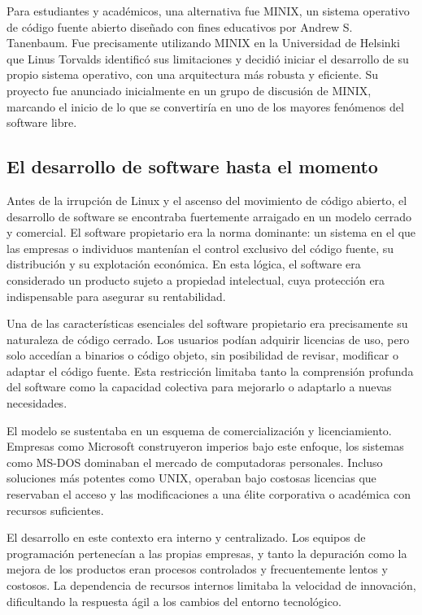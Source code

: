 \documentclass[a4paper,12pt]{article}
\begin{document}
Para estudiantes y académicos, una alternativa fue MINIX, un
sistema operativo de código fuente abierto diseñado con fines educativos por
Andrew S. Tanenbaum.  Fue precisamente utilizando MINIX en la
Universidad de Helsinki que Linus Torvalds identificó sus limitaciones y decidió
iniciar el desarrollo de su propio sistema operativo, con una arquitectura más
robusta y eficiente. Su proyecto fue anunciado inicialmente en un grupo de
discusión de MINIX, marcando el inicio de lo que se
convertiría en uno de los mayores fenómenos del software libre.


\subsection{El desarrollo de software hasta el momento}

Antes de la irrupción de Linux y el ascenso del movimiento de código abierto, el
desarrollo de software se encontraba fuertemente arraigado en un modelo cerrado
y comercial. El software propietario era la norma dominante: un sistema en el
que las empresas o individuos mantenían el control exclusivo del código fuente,
su distribución y su explotación económica. En esta lógica, el software era
considerado un producto sujeto a propiedad intelectual, cuya protección era
indispensable para asegurar su rentabilidad.

Una de las características esenciales del software propietario era precisamente
su naturaleza de código cerrado. Los usuarios podían adquirir licencias de uso,
pero solo accedían a binarios o código objeto, sin posibilidad de revisar,
modificar o adaptar el código fuente. Esta restricción limitaba tanto la
comprensión profunda del software como la capacidad colectiva para mejorarlo o
adaptarlo a nuevas necesidades.

El modelo se sustentaba en un esquema de comercialización y licenciamiento.
Empresas como Microsoft construyeron imperios bajo este
enfoque, los sistemas como MS-DOS dominaban el mercado de
computadoras personales. Incluso soluciones más potentes como
UNIX, operaban bajo costosas licencias que reservaban el acceso
y las modificaciones a una élite corporativa o académica con recursos
suficientes.

El desarrollo en este contexto era interno y centralizado. Los equipos de
programación pertenecían a las propias empresas, y tanto la depuración como la
mejora de los productos eran procesos controlados y frecuentemente lentos y
costosos. La dependencia de recursos internos limitaba la velocidad de
innovación, dificultando la respuesta ágil a los cambios del entorno
tecnológico.
\end{document}
